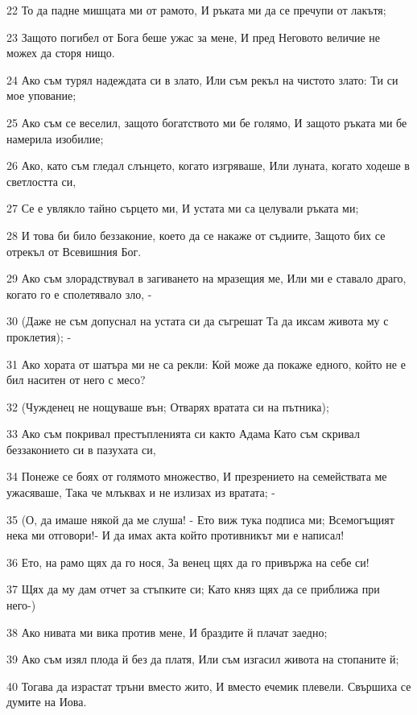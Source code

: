 \par 22 То да падне мишцата ми от рамото, И ръката ми да се пречупи от лакътя;
\par 23 Защото погибел от Бога беше ужас за мене, И пред Неговото величие не можех да сторя нищо.
\par 24 Ако съм турял надеждата си в злато, Или съм рекъл на чистото злато: Ти си мое упование;
\par 25 Ако съм се веселил, защото богатството ми бе голямо, И защото ръката ми бе намерила изобилие;
\par 26 Ако, като съм гледал слънцето, когато изгряваше, Или луната, когато ходеше в светлостта си,
\par 27 Се е увлякло тайно сърцето ми, И устата ми са целували ръката ми;
\par 28 И това би било беззаконие, което да се накаже от съдиите, Защото бих се отрекъл от Всевишния Бог.
\par 29 Ако съм злорадствувал в загиването на мразещия ме, Или ми е ставало драго, когато го е сполетявало зло, -
\par 30 (Даже не съм допуснал на устата си да съгрешат Та да иксам живота му с проклетия); -
\par 31 Ако хората от шатъра ми не са рекли: Кой може да покаже едного, който не е бил наситен от него с месо?
\par 32 (Чужденец не нощуваше вън; Отварях вратата си на пътника);
\par 33 Ако съм покривал престъпленията си както Адама Като съм скривал беззаконието си в пазухата си,
\par 34 Понеже се боях от голямото множество, И презрението на семействата ме ужасяваше, Така че млъквах и не излизах из вратата; -
\par 35 (О, да имаше някой да ме слуша! - Ето виж тука подписа ми; Всемогъщият нека ми отговори!- И да имах акта който противникът ми е написал!
\par 36 Ето, на рамо щях да го нося, За венец щях да го привържа на себе си!
\par 37 Щях да му дам отчет за стъпките си; Като княз щях да се приближа при него-)
\par 38 Ако нивата ми вика против мене, И браздите й плачат заедно;
\par 39 Ако съм изял плода й без да платя, Или съм изгасил живота на стопаните й;
\par 40 Тогава да израстат тръни вместо жито, И вместо ечемик плевели. Свършиха се думите на Иова.

